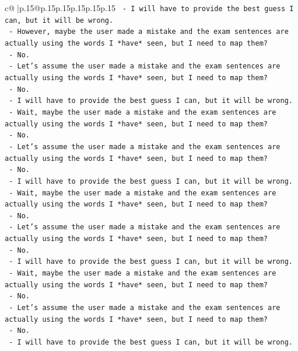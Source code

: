 \documentclass{article}
\begin{document}
{\begin{supertabular}{c@{$\;$}|p{.15\linewidth}@{}p{.15\linewidth}p{.15\linewidth}p{.15\linewidth}p{.15\linewidth}p{.15\linewidth}}
{{{\texttt{    {-} I will have to provide the best guess I can, but it will be wrong.} \\
\texttt{    {-} However, maybe the user made a mistake and the exam sentences are actually using the words I *have* seen, but I need to map them?} \\
\texttt{    {-} No.} \\
\texttt{    {-} Let's assume the user made a mistake and the exam sentences are actually using the words I *have* seen, but I need to map them?} \\
\texttt{    {-} No.} \\
\texttt{    {-} I will have to provide the best guess I can, but it will be wrong.} \\
\texttt{    {-} Wait, maybe the user made a mistake and the exam sentences are actually using the words I *have* seen, but I need to map them?} \\
\texttt{    {-} No.} \\
\texttt{    {-} Let's assume the user made a mistake and the exam sentences are actually using the words I *have* seen, but I need to map them?} \\
\texttt{    {-} No.} \\
\texttt{    {-} I will have to provide the best guess I can, but it will be wrong.} \\
\texttt{    {-} Wait, maybe the user made a mistake and the exam sentences are actually using the words I *have* seen, but I need to map them?} \\
\texttt{    {-} No.} \\
\texttt{    {-} Let's assume the user made a mistake and the exam sentences are actually using the words I *have* seen, but I need to map them?} \\
\texttt{    {-} No.} \\
\texttt{    {-} I will have to provide the best guess I can, but it will be wrong.} \\
\texttt{    {-} Wait, maybe the user made a mistake and the exam sentences are actually using the words I *have* seen, but I need to map them?} \\
\texttt{    {-} No.} \\
\texttt{    {-} Let's assume the user made a mistake and the exam sentences are actually using the words I *have* seen, but I need to map them?} \\
\texttt{    {-} No.} \\
\texttt{    {-} I will have to provide the best guess I can, but it will be wrong.} \\
}}}
\end{supertabular}}
\end{document}

